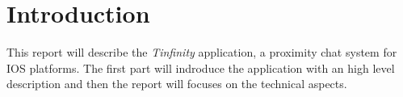 \section{Introduction}
This report will describe the \emph{Tinfinity} application, a proximity chat system for IOS platforms. The first part will indroduce the application with an high level description and then the report will focuses on the technical aspects.